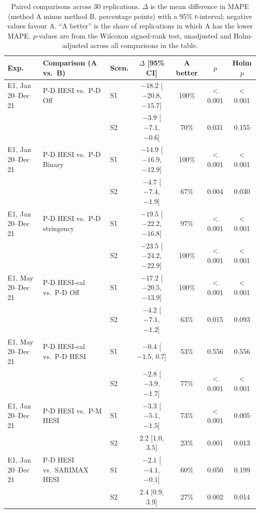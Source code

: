 \documentclass{article}
\theoremstyle{plain}
\theoremstyle{definition}
\theoremstyle{remark}
\begin{document}
\begin{table}[!tb]
\centering
\caption{Paired comparisons across 30 replications. $\Delta$ is the mean difference in MAPE (method A minus method B, percentage points) with a 95\% $t$-interval; negative values favour A. ``A better'' is the share of replications in which A has the lower MAPE. $p$-values are from the Wilcoxon signed-rank test, unadjusted and Holm-adjusted across all comparisons in the table.}
\label{tab:paired}
\scriptsize
\setlength{\tabcolsep}{3.5pt}
\begin{tabular}{lllcccc}
\toprule
Exp. & Comparison (A vs.\ B) & Scen. & $\Delta$ [95\% CI] & A better & $p$ & Holm $p$ \\
\midrule
E1, Jan 20--Dec 21 & P-D HESI vs.\ P-D Off & S1 & $-18.2$ [$-20.8$, $-15.7$] & 100\% & $<$0.001 & $<$0.001 \\
 &  & S2 & $-3.9$ [$-7.1$, $-0.6$] & 70\% & 0.031 & 0.155 \\
\addlinespace[1pt]
E1, Jan 20--Dec 21 & P-D HESI vs.\ P-D Binary & S1 & $-14.9$ [$-16.9$, $-12.9$] & 100\% & $<$0.001 & $<$0.001 \\
 &  & S2 & $-4.7$ [$-7.4$, $-1.9$] & 67\% & 0.004 & 0.030 \\
\addlinespace[1pt]
E1, Jan 20--Dec 21 & P-D HESI vs.\ P-D stringency & S1 & $-19.5$ [$-22.2$, $-16.8$] & 97\% & $<$0.001 & $<$0.001 \\
 &  & S2 & $-23.5$ [$-24.2$, $-22.9$] & 100\% & $<$0.001 & $<$0.001 \\
\addlinespace[1pt]
E1, May 20--Dec 21 & P-D HESI-cal vs.\ P-D Off & S1 & $-17.2$ [$-20.5$, $-13.9$] & 100\% & $<$0.001 & $<$0.001 \\
 &  & S2 & $-4.2$ [$-7.1$, $-1.2$] & 63\% & 0.015 & 0.093 \\
\addlinespace[1pt]
E1, May 20--Dec 21 & P-D HESI-cal vs.\ P-D HESI & S1 & $-0.4$ [$-1.5$, $0.7$] & 53\% & 0.556 & 0.556 \\
 &  & S2 & $-2.8$ [$-3.9$, $-1.7$] & 77\% & $<$0.001 & $<$0.001 \\
\addlinespace[1pt]
E1, Jan 20--Dec 21 & P-D HESI vs.\ P-M HESI & S1 & $-3.3$ [$-5.1$, $-1.5$] & 73\% & $<$0.001 & 0.005 \\
 &  & S2 & $2.2$ [$1.0$, $3.5$] & 23\% & 0.001 & 0.013 \\
\addlinespace[1pt]
E1, Jan 20--Dec 21 & P-D HESI vs.\ SARIMAX HESI & S1 & $-2.1$ [$-4.1$, $-0.1$] & 60\% & 0.050 & 0.199 \\
 &  & S2 & $2.4$ [$0.9$, $3.9$] & 27\% & 0.002 & 0.014 \\

\end{tabular}
\end{table}
\end{document}
